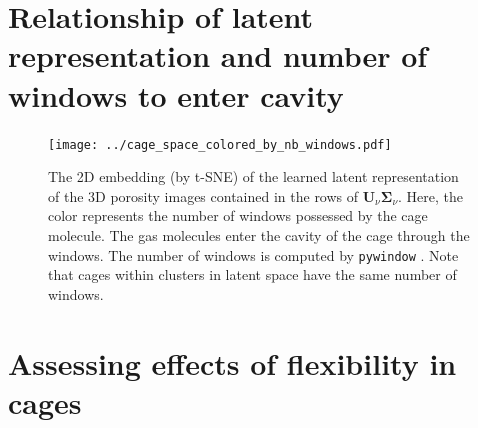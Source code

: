 \documentclass[journal=jacsat,manuscript=article]{achemso}
\begin{document}
\newpage
\clearpage

\section{Relationship of latent representation and number of windows to enter cavity}

\begin{figure}
\centering
	\texttt{[image: ../cage\_space\_colored\_by\_nb\_windows.pdf]}
	\caption{The 2D embedding (by t-SNE) of the learned latent representation of the 3D porosity images contained in the rows of $\mathbf{U}_\nu \mathbf{\Sigma}_\nu$. Here, the color represents the number of windows possessed by the cage molecule. The gas molecules enter the cavity of the cage through the windows. The number of windows is computed by \texttt{pywindow} \cite{miklitz2018pywindow}. Note that cages within clusters in latent space have the same number of windows.
	} \label{fig:cage_space_colored_by_nb_windows}
\end{figure}

\newpage
\clearpage

\section{\color{red}Assessing effects of flexibility in cages} 
\label{sec:flexibility}
\end{document}
